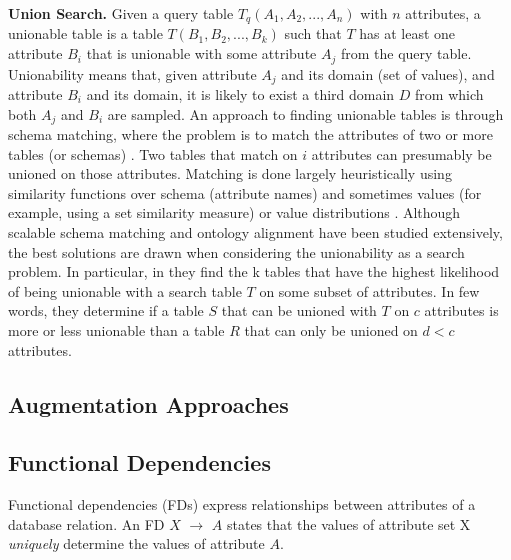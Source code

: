 \textbf{Union Search.} Given a query table $T_q(A_1,A_2,...,A_n)$ with $n$ attributes, a unionable table is a table $T(B_1, B_2,...,B_k)$ such that $T$ has at least one attribute $B_i$ that is unionable with some attribute $A_j$ from the query table. Unionability means that, given attribute $A_j$ and its domain (set of values), and attribute $B_i$ and its domain, it is likely to exist a third domain $D$ from which both $A_j$ and $B_i$ are sampled. An approach to finding unionable tables is through schema matching, where the problem is to match the attributes of two or more tables (or schemas) \cite{he2003statistical,rahm2011towards}. Two tables that match on $i$ attributes can presumably be unioned on those attributes. Matching is done largely heuristically using similarity functions over schema (attribute names) and sometimes values (for example, using a set similarity measure) or value distributions \cite{kang2003schema}. Although scalable schema matching and ontology alignment have been studied extensively, the best solutions are drawn when considering the unionability as a search problem. In particular, in \cite{nargesian2018table} they find the k tables that have the highest likelihood of being unionable with a search table $T$ on some subset of attributes. In few words, they determine if a table $S$ that can be unioned with $T$ on $c$ attributes is more or less unionable than a table $R$ that can only be unioned on $d < c$ attributes.


\subsection{Augmentation Approaches}


\subsection{Functional Dependencies}\label{fds}
Functional dependencies (FDs) express relationships between attributes of a database relation. An FD $X$ $\rightarrow$ $A$ states that the values of attribute set X \textit{uniquely} determine the values of attribute $A$.